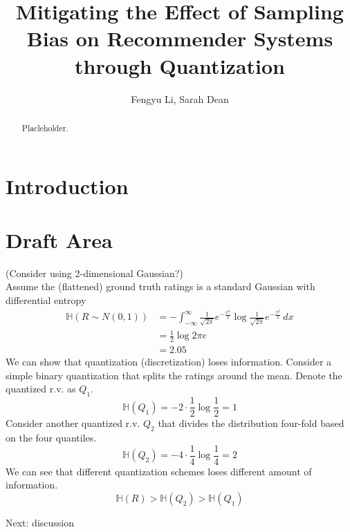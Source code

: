 \documentclass[12pt, letterpaper]{article}
\title{\vspace{-2.0cm}Mitigating the Effect of Sampling Bias on Recommender Systems through Quantization}
\author{Fengyu Li, Sarah Dean}
\date{}
\theoremstyle{definition}\newtheorem*{definition}{Definition}
\theoremstyle{definition}\newtheorem*{example}{Example}
\theoremstyle{definition}\newtheorem*{remark}{Remark}
\def\HH{\mathbb{H}}
\begin{document}
\maketitle

\begin{abstract}
    Placleholder.
\end{abstract}

\section{Introduction}

\section{Draft Area}
 (Consider using 2-dimensional Gaussian?)\\
Assume the (flattened) ground truth ratings is a standard Gaussian with differential entropy
\begin{align*} \HH(R\sim N(0, 1)) & = -\int_{-\infty}^\infty \frac{1}{\sqrt{2\pi}}e^{-\frac{x^2}{2}} \log \frac{1}{\sqrt{2\pi}}e^{-\frac{x^2}{2}} \, dx \\
                                  & = \frac{1}{2}\log 2\pi e          \\
                                  & = 2.05
\end{align*}
We can show that quantization (discretization) loses information. Consider
a simple binary quantization that splits the ratings around the mean. Denote the quantized r.v. as $Q_1$.
\[ \HH(Q_1) = -2 \cdot \frac{1}{2} \log \frac{1}{2} = 1 \]
Consider another quantized r.v. $Q_2$ that divides the distribution four-fold based on the four quantiles.
\[ \HH(Q_2) = -4 \cdot \frac{1}{4} \log \frac{1}{4} = 2 \]
We can see that different quantization schemes loses different amount of information.
\[ \HH(R) > \HH(Q_2) > \HH(Q_1) \]

Next: discussion
\end{document}
